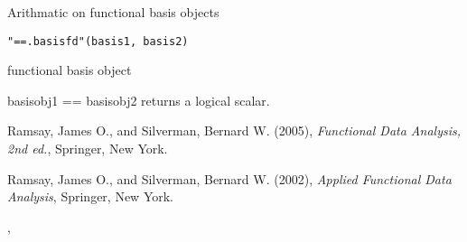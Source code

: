 \documentclass{article}
\begin{document}
\begin{Description}\relax
Arithmatic on functional basis objects
\end{Description}
\begin{Usage}
\begin{verbatim}
"==.basisfd"(basis1, basis2)
\end{verbatim}
\end{Usage}
\begin{Arguments}
\begin{ldescription}
\item[\code{basis1, basis2}] functional basis object 

\end{ldescription}
\end{Arguments}
\begin{Value}
basisobj1 == basisobj2 returns a logical scalar.
\end{Value}
\begin{References}\relax
Ramsay, James O., and Silverman, Bernard W. (2005), \emph{Functional 
Data Analysis, 2nd ed.}, Springer, New York. 

Ramsay, James O., and Silverman, Bernard W. (2002), \emph{Applied
Functional Data Analysis}, Springer, New York.
\end{References}
\begin{SeeAlso}\relax
{}, 
\end{SeeAlso}
\end{document}
